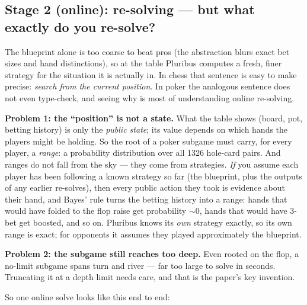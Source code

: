 \documentclass[11pt,a4paper]{article}
\begin{document}
\subsection{Stage 2 (online): re-solving --- but what exactly do you re-solve?}

The blueprint alone is too coarse to beat pros (the abstraction blurs exact
bet sizes and hand distinctions), so at the table Pluribus computes a fresh,
finer strategy for the situation it is actually in. In chess that sentence is
easy to make precise: \emph{search from the current position}. In poker the
analogous sentence does not even type-check, and seeing why is most of
understanding online re-solving.

\textbf{Problem 1: the ``position'' is not a state.} What the table shows
(board, pot, betting history) is only the \emph{public state}; its value
depends on which hands the players might be holding. So the root of a poker
subgame must carry, for every player, a \emph{range}: a probability
distribution over all 1326 hole-card pairs. And ranges do not fall from the
sky --- they come from strategies. \emph{If} you assume each player has been
following a known strategy so far (the blueprint, plus the outputs of any
earlier re-solves), then every public action they took is evidence about
their hand, and Bayes' rule turns the betting history into a range:
hands that would have folded to the flop raise get probability ${\sim}0$,
hands that would have 3-bet get boosted, and so on. Pluribus knows its
\emph{own} strategy exactly, so its own range is exact; for opponents it
assumes they played approximately the blueprint.

\textbf{Problem 2: the subgame still reaches too deep.} Even rooted on the
flop, a no-limit subgame spans turn and river --- far too large to solve in
seconds. Truncating it at a depth limit needs care, and that is the paper's
key invention.

So one online solve looks like this end to end:
\end{document}
